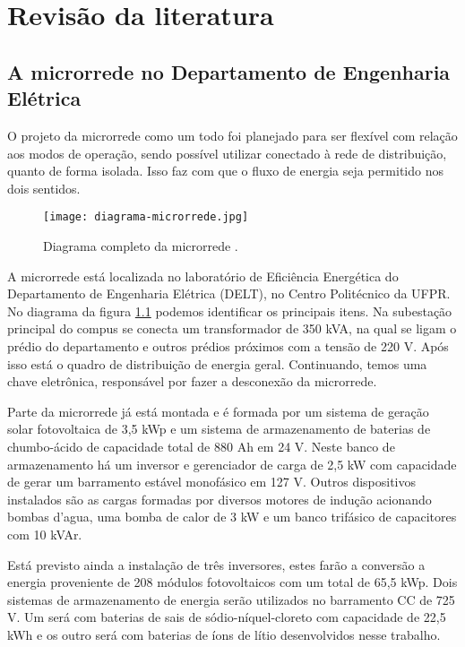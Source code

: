 \chapter{Revisão da literatura}
\label{cap:exemplos}

\graphicspath{{\currfiledir/figuras/}}


\section{A microrrede no Departamento de Engenharia Elétrica}

   O projeto da microrrede como um todo foi planejado para ser flexível com relação aos modos de operação, sendo possível utilizar conectado à rede de distribuição, quanto de forma isolada. Isso faz com que o fluxo de energia seja permitido nos dois sentidos. 

   \begin{figure}[!htb]
      \centering
      \texttt{[image: diagrama-microrrede.jpg]}
      \caption{Diagrama completo da microrrede \cite{Dem19}.}
      \label{fig:diagrama-microrrede}
   \end{figure}

   A microrrede está localizada no laboratório de Eficiência Energética do Departamento de Engenharia Elétrica (DELT), no Centro Politécnico da UFPR. No diagrama da figura \ref{fig:diagrama-microrrede} podemos identificar os principais itens. Na subestação principal do compus se conecta um transformador de 350 kVA, na qual se ligam o prédio do departamento e outros prédios próximos com a tensão de 220 V. Após isso está o quadro de distribuição de energia geral. Continuando, temos uma chave eletrônica, responsável por fazer a desconexão da microrrede. 

   Parte da microrrede já está montada e é formada por um sistema de geração solar fotovoltaica de 3,5 kWp e um sistema de armazenamento de baterias de chumbo-ácido de capacidade total de 880 Ah em 24 V. Neste banco de armazenamento há um inversor e gerenciador de carga de 2,5 kW com capacidade de gerar um barramento estável monofásico em 127 V. Outros dispositivos instalados são as cargas formadas por diversos motores de indução acionando bombas d'agua, uma bomba de calor de 3 kW e um banco trifásico de capacitores com 10 kVAr.

   Está previsto ainda a instalação de três inversores, estes farão a conversão a energia proveniente de 208 módulos fotovoltaicos com um total de 65,5 kWp. Dois sistemas de armazenamento de energia serão utilizados no barramento CC de 725 V. Um será com baterias de sais de sódio-níquel-cloreto com capacidade de 22,5 kWh e os outro será com baterias de íons de lítio desenvolvidos nesse trabalho.

